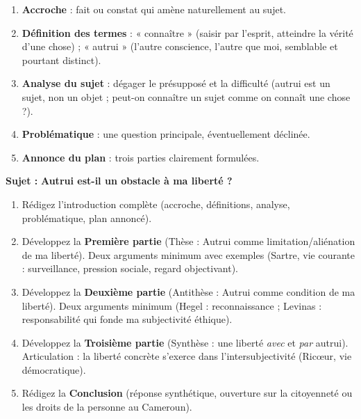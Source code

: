 \documentclass[11pt]{article}
\newcounter{popsec}
\newcounter{popsub}
\newcommand{\courssub}[1]{%
  \stepcounter{popsub}%
  \par\vspace{9pt}\noindent{\popxbold\fontsize{11.5}{13}\selectfont\color{popink}{\color{poporange}\thepopsec.\thepopsub}\hspace{6pt}#1}\par\nopagebreak\vspace{4pt}
}
\begin{document}
\begin{methode}
\begin{enumerate}
    \item \textbf{Accroche} : fait ou constat qui amène naturellement au sujet.
    \item \textbf{Définition des termes} : « connaître » (saisir par l'esprit, atteindre la vérité d'une chose) ; « autrui » (l'autre conscience, l'autre que moi, semblable et pourtant distinct).
    \item \textbf{Analyse du sujet} : dégager le présupposé et la difficulté (autrui est un sujet, non un objet ; peut-on connaître un sujet comme on connaît une chose ?).
    \item \textbf{Problématique} : une question principale, éventuellement déclinée.
    \item \textbf{Annonce du plan} : trois parties clairement formulées.
\end{enumerate}
\end{methode}

\courssub{Je me prépare au Bac}

\begin{exercice}
\textbf{Sujet :} \og \textbf{Autrui est-il un obstacle à ma liberté ?} \fg

\begin{enumerate}
    \item Rédigez l'introduction complète (accroche, définitions, analyse, problématique, plan annoncé).
    \item Développez la \textbf{Première partie} (Thèse : Autrui comme limitation/aliénation de ma liberté). Deux arguments minimum avec exemples (Sartre, vie courante : surveillance, pression sociale, regard objectivant).
    \item Développez la \textbf{Deuxième partie} (Antithèse : Autrui comme condition de ma liberté). Deux arguments minimum (Hegel : reconnaissance ; Levinas : responsabilité qui fonde ma subjectivité éthique).
    \item Développez la \textbf{Troisième partie} (Synthèse : une liberté \emph{avec} et \emph{par} autrui). Articulation : la liberté concrète s'exerce dans l'intersubjectivité (Ricœur, vie démocratique).
    \item Rédigez la \textbf{Conclusion} (réponse synthétique, ouverture sur la citoyenneté ou les droits de la personne au Cameroun).
\end{enumerate}
\end{exercice}
\end{document}
